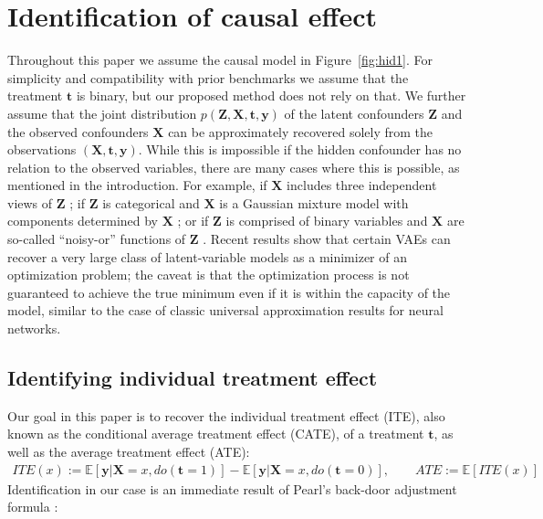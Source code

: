 \documentclass{article}
\DeclareMathOperator{\E}{\mathbb{E}}
\def\*#1{\mathbf{#1}}
\def\E{\mathbb{E}}
\begin{document}
 
\section{Identification of causal effect}\label{sec:ident}
Throughout this paper we assume the causal model in Figure~\ref{fig:hid1}. For simplicity and compatibility with prior benchmarks we assume that the treatment $\*t$ is binary, but our proposed method does not rely on that. We further assume that the joint distribution $p\left(\*Z,\*X,\*t,\*y\right)$ of the latent confounders $\*Z$ and the observed confounders $\*X$ can be approximately recovered solely from the observations $\left(\*X,\*t,\*y\right)$. While this is impossible if the hidden confounder has no relation to the observed variables, there are many cases where this is possible, as mentioned in the introduction.
For example, if $\*X$ includes three independent views of $\*Z$ \citep{anandkumar2012method,hsu2012spectral,goodman1974exploratory,allman2009identifiability}; if $\*Z$ is categorical and $\*X$ is a Gaussian mixture model with components determined by $\*X$ \citep{anandkumar2014tensor};  or if $\*Z$ is comprised of binary variables and $\*X$ are so-called ``noisy-or'' functions of $\*Z$ \citep{jernite2013discovering,tengyu_noisyor16}. Recent results show that certain VAEs can recover a very large class of latent-variable models \citep{tran2015variational} as a minimizer of an optimization problem; the caveat is that the optimization process is not guaranteed to achieve the true minimum even if it is within the capacity of the model, similar to the case of classic universal approximation results for neural networks.

\subsection{Identifying individual treatment effect}
Our goal in this paper is to recover the individual treatment effect (ITE), also known as the conditional average treatment effect (CATE), of a treatment $\*t$, as well as the average treatment effect (ATE):
\begin{align*}ITE(x) := \E\left[\*y |\*X=x, do(\*t=1)\right] - \E\left[\*y |\*X=x, do(\*t=0)\right], 
\quad \quad ATE := \mathbb{E}[ITE(x)] 
\end{align*}
Identification in our case is an immediate result of Pearl's back-door adjustment formula \citep{pearl2009causality}:
\end{document}
